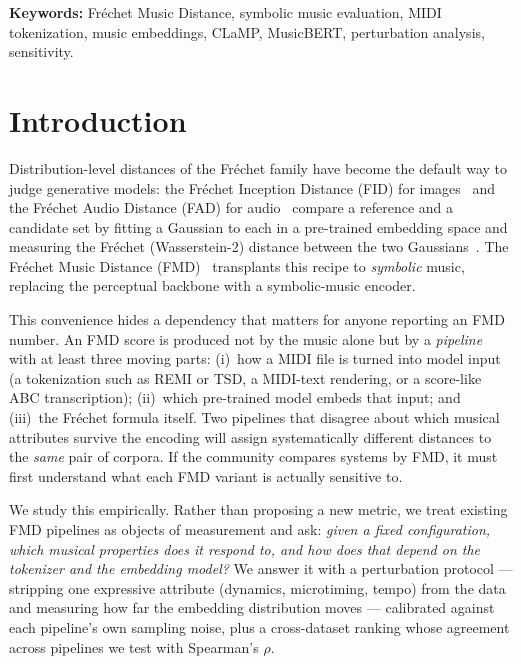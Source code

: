 \documentclass[11pt]{article}
\begin{document}
\noindent\textbf{Keywords:} Fr\'echet Music Distance, symbolic music
evaluation, MIDI tokenization, music embeddings, CLaMP, MusicBERT,
perturbation analysis, sensitivity.

\section{Introduction}
Distribution-level distances of the Fr\'echet family have become the
default way to judge generative models: the Fr\'echet Inception Distance
(FID) for images~\cite{heusel2017fid} and the Fr\'echet Audio Distance
(FAD) for audio~\cite{kilgour2019fad} compare a reference and a candidate
set by fitting a Gaussian to each in a pre-trained embedding space and
measuring the Fr\'echet (Wasserstein-2) distance between the two
Gaussians~\cite{dowson1982frechet}. The Fr\'echet Music Distance
(FMD)~\cite{retkowski2025fmd} transplants this recipe to \emph{symbolic}
music, replacing the perceptual backbone with a symbolic-music encoder.

This convenience hides a dependency that matters for anyone reporting an
FMD number. An FMD score is produced not by the music alone but by a
\emph{pipeline} with at least three moving parts: (i)~how a MIDI file is
turned into model input (a tokenization such as REMI or TSD, a MIDI-text
rendering, or a score-like ABC transcription); (ii)~which pre-trained
model embeds that input; and (iii)~the Fr\'echet formula itself. Two
pipelines that disagree about which musical attributes survive the
encoding will assign systematically different distances to the
\emph{same} pair of corpora. If the community compares systems by FMD, it
must first understand what each FMD variant is actually sensitive to.

We study this empirically. Rather than proposing a new metric, we treat
existing FMD pipelines as objects of measurement and ask: \emph{given a
fixed configuration, which musical properties does it respond to, and how
does that depend on the tokenizer and the embedding model?} We answer it
with a perturbation protocol --- stripping one expressive attribute
(dynamics, microtiming, tempo) from the data and measuring how far the
embedding distribution moves --- calibrated against each pipeline's own
sampling noise, plus a cross-dataset ranking whose agreement across
pipelines we test with Spearman's $\rho$.
\end{document}
